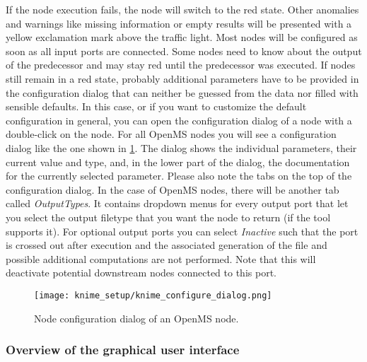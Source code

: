 If the node execution fails, the node will switch to the red state. Other anomalies and warnings like missing information or empty results 
will be presented with a yellow exclamation mark above the traffic light.
Most nodes will be configured as soon as all input ports are connected. Some nodes need to know about the output of the predecessor and may stay red until the predecessor was executed.
If nodes still remain in a red state, probably additional parameters have to be provided in the configuration dialog that can neither be guessed from the data nor filled with sensible defaults.
In this case, or if you want to customize the default configuration in general, you can open the configuration dialog of a node with a double-click on the node.
For all OpenMS nodes you will see a configuration dialog like the one shown in \cref{fig:knime_configure}.
The dialog shows the individual parameters, their current value and type, and, in the lower part of the dialog, the 
documentation for the currently selected parameter. Please also note the tabs on the top of the configuration dialog. 
In the case of OpenMS nodes, there will be another tab called \textit{OutputTypes}. It contains dropdown menus for 
every output port that let you select the output filetype that you want the node to return (if the tool supports 
it). For optional output ports you can select \textit{Inactive} such that the port is crossed out after execution and 
the associated generation of the file and possible additional computations are not performed. Note that this will 
deactivate potential downstream nodes connected to this port.

\begin{figure}
\centering
\texttt{[image: knime\_setup/knime\_configure\_dialog.png]}
\caption{Node configuration dialog of an OpenMS node.}
\label{fig:knime_configure}
\end{figure}

\subsubsection{Overview of the graphical user interface}

